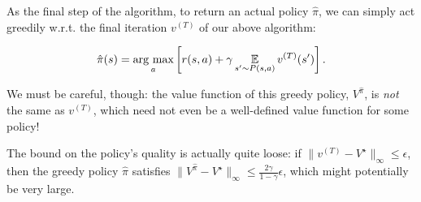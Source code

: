 \documentclass[../main/main]{subfiles}
\begin{document}
As the final step of the algorithm, to return an actual policy $\hat \pi$, we can simply act greedily w.r.t. the final iteration $v^{(T)}$ of our above algorithm:

\[
    \hat \pi(s) = \operatorname*{\textrm{arg\ max}}_a \left[ r(s, a) + \gamma \operatorname*{\mathbb{E}}_{s' \sim P(s, a)} v^{(T)}(s') \right].
\]

We must be careful, though: the value function of this greedy policy, $V^{\hat \pi}$, is \emph{not} the same as $v^{(T)}$, which need not even be a well-defined value function for some policy!

The bound on the policy's quality is actually quite loose: if $\|v^{(T)} - V^\star\|_{\infty} \le \epsilon$, then the greedy policy $\hat \pi$ satisfies $\|V^{\hat \pi} - V^\star\|_{\infty} \le \frac{2\gamma}{1-\gamma} \epsilon$, which might potentially be very large.
\end{document}
